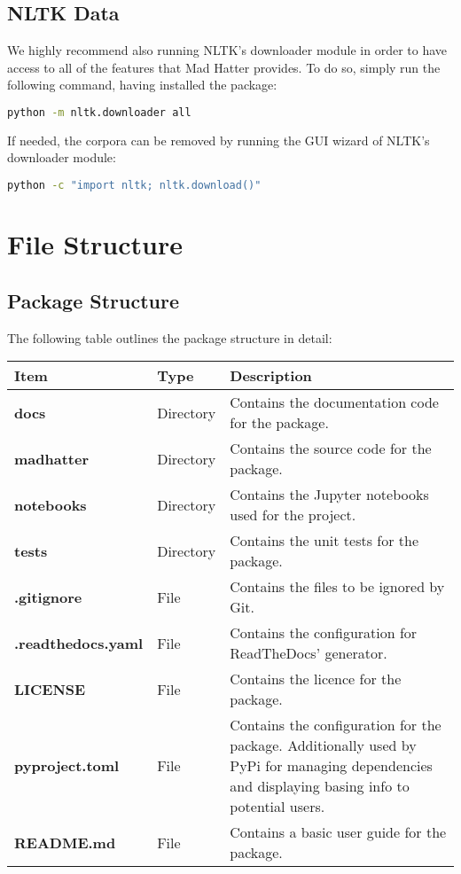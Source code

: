 \subsection{NLTK Data}

We highly recommend also running NLTK's downloader module in order to have access to all of the features that Mad Hatter provides. To do so, simply run the following command, having installed the package:

\begin{lstlisting}[language=bash]
    python -m nltk.downloader all
\end{lstlisting}

If needed, the corpora can be removed by running the GUI wizard of NLTK's downloader module:

\begin{lstlisting}[language=bash]
    python -c "import nltk; nltk.download()"
\end{lstlisting}

\section{File Structure}
\subsection{Package Structure}
The following table outlines the package structure in detail:
\begin{table}[htbp]
    \centering
    \begin{tabular}{p{}p{}p{}}
        \toprule 
        \textbf{Item} & \textbf{Type}  & \textbf{Description} \\
        \midrule
        \textbf{docs} & Directory & Contains the documentation code for the package. \\
        \textbf{madhatter} & Directory & Contains the source code for the package. \\
        \textbf{notebooks} & Directory & Contains the Jupyter notebooks used for the project. \\
        \textbf{tests} & Directory & Contains the unit tests for the package. \\
        \textbf{.gitignore} & File & Contains the files to be ignored by Git. \\
        \textbf{.readthedocs.yaml} & File & Contains the configuration for ReadTheDocs' generator. \\
        \textbf{LICENSE} & File & Contains the licence for the package. \\
        \textbf{pyproject.toml} & File & Contains the configuration for the package. Additionally used by PyPi for managing dependencies and displaying basing info to potential users. \\
        \textbf{README.md} & File & Contains a basic user guide for the package. \\

    \end{tabular}
\end{table}

